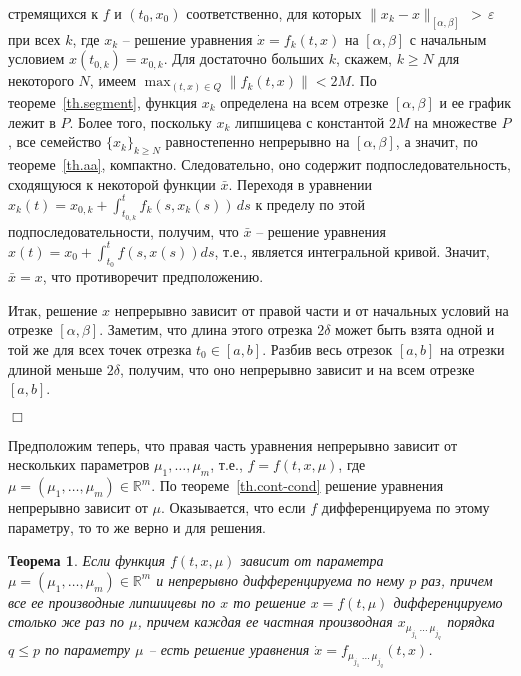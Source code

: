 \documentclass[12pt,a4paper]{article}
\newtheorem{theorem}{Теорема}
\newcommand{\re}{{\mathbb R}}
\begin{document}
стремящихся к $f$ и $(t_0, x_0)$ соответственно, для которых $\|x_k - x\|_{[\alpha, \beta]}\,  > \, \varepsilon$ при всех $k$,
где $x_k$ -- решение уравнения $\dot x = f_k(t, x)$ на $[\alpha, \beta]$ с начальным  условием $x(t_{0, k}) = x_{0, k}$.
Для достаточно больших $k$, скажем, $k \ge N$ для некоторого $N$,
  имеем $\max_{(t, x) \in Q} \|f_k(t, x)\| < 2M$. По теореме~\ref{th.segment},
функция $x_k$ определена на всем отрезке $[\alpha, \beta]$ и ее график лежит в $P$.
Более того, поскольку $x_k$ липшицева с константой $2M$ на множестве $P$, все семейство $\{x_k\}_{k \ge N}$
равностепенно непрерывно на $[\alpha, \beta]$, а значит, по теореме~\ref{th.aa}, компактно.
Следовательно, оно содержит подпоследовательность, сходящуюся к некоторой функции $\bar x$.
Переходя в уравнении $x_k(t) = x_{0, k} + \int_{t_{0, k}}^t f_k(s, x_k(s))\, ds$
к пределу по этой подпоследовательности, получим, что $\bar x$ -- решение уравнения
$x(t) = x_0 + \int_{t_0}^t f(s, x(s))ds$, т.е., является интегральной кривой.
Значит, $\bar x = x$, что противоречит предположению.

Итак, решение $x$ непрерывно зависит от правой части и от начальных условий  на отрезке $[\alpha, \beta]$.
Заметим, что длина этого отрезка $2\delta$ может быть взята одной и той же для всех точек отрезка $t_0 \in [a, b]$.
Разбив весь отрезок $[a, b]$ на отрезки длиной меньше $2\delta$, получим, что оно непрерывно зависит и на всем отрезке $[a, b]$.



   {\hfill $\Box$}
\medskip

Предположим теперь, что правая часть уравнения непрерывно зависит от нескольких параметров $\mu_1, \ldots , \mu_m$,
т.е.,  $f = f(t, x, \mu)$, где $\mu = (\mu_1, \ldots , \mu_m) \in \re^m$. По теореме~\ref{th.cont-cond}
решение уравнения непрерывно зависит от $\mu$. Оказывается, что если $f$ дифференцируема по этому параметру, то
то же верно и для решения.
\begin{theorem}\label{th.diff-param}
Если функция $f(t, x, \mu)$ зависит от параметра $\mu = (\mu_1, \ldots , \mu_m) \in \re^m$ и непрерывно дифференцируема по нему $p$ раз,
причем все ее производные липшицевы по $x$ то решение $x = f(t, \mu)$ дифференцируемо столько же раз
по $\mu$, причем каждая ее частная производная $x_{\mu_{j_1}\, \ldots \, \mu_{j_q}}$ порядка  $q \le p$ по параметру $\mu$ -- есть решение уравнения $\dot x  = f_{\mu_{j_1} \, \ldots \, \mu_{j_q}}(t, x)$.
\end{theorem}


\bigskip
\end{document}
